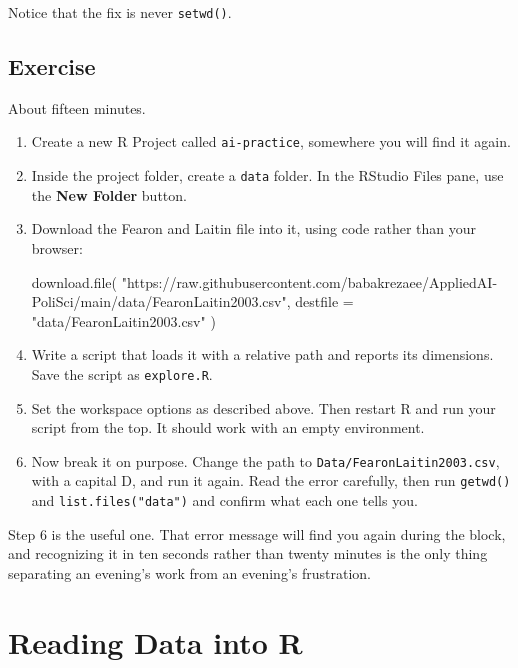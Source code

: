 \documentclass[
  a4paper,
]{scrbook}
\newenvironment{Shaded}{\begin{snugshade}}{\end{snugshade}}
\newcommand{\AttributeTok}[1]{\textcolor[rgb]{0.40,0.45,0.13}{#1}}
\newcommand{\FunctionTok}[1]{\textcolor[rgb]{0.28,0.35,0.67}{#1}}
\newcommand{\NormalTok}[1]{\textcolor[rgb]{0.00,0.23,0.31}{#1}}
\newcommand{\StringTok}[1]{\textcolor[rgb]{0.13,0.47,0.30}{#1}}
\begin{document}
Notice that the fix is never \texttt{setwd()}.

\section*{Exercise}\label{exercise-2}


About fifteen minutes.

\begin{enumerate}
\def\labelenumi{\arabic{enumi}.}
\item
  Create a new R Project called \texttt{ai-practice}, somewhere you will
  find it again.
\item
  Inside the project folder, create a \texttt{data} folder. In the
  RStudio Files pane, use the \textbf{New Folder} button.
\item
  Download the Fearon and Laitin file into it, using code rather than
  your browser:

\begin{Shaded}
\begin{Highlighting}[]
\FunctionTok{download.file}\NormalTok{(}
  \StringTok{"https://raw.githubusercontent.com/babakrezaee/AppliedAI{-}PoliSci/main/data/FearonLaitin2003.csv"}\NormalTok{,}
  \AttributeTok{destfile =} \StringTok{"data/FearonLaitin2003.csv"}
\NormalTok{)}
\end{Highlighting}
\end{Shaded}
\item
  Write a script that loads it with a relative path and reports its
  dimensions. Save the script as \texttt{explore.R}.
\item
  Set the workspace options as described above. Then restart R and run
  your script from the top. It should work with an empty environment.
\item
  Now break it on purpose. Change the path to
  \texttt{Data/FearonLaitin2003.csv}, with a capital D, and run it
  again. Read the error carefully, then run \texttt{getwd()} and
  \texttt{list.files("data")} and confirm what each one tells you.
\end{enumerate}

Step 6 is the useful one. That error message will find you again during
the block, and recognizing it in ten seconds rather than twenty minutes
is the only thing separating an evening's work from an evening's
frustration.

\chapter*{Reading Data into R}\label{reading-data-into-r}
\end{document}
